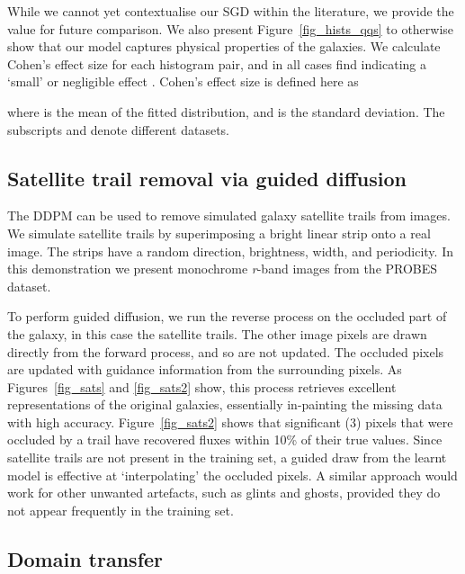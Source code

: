 \documentclass[fleqn,usenatbib]{mnras}
\begin{document}
While we cannot yet contextualise our SGD within the literature, we provide the
value for future comparison. We also present Figure~\ref{fig_hists_qqs} to
otherwise show that our model captures physical properties of the galaxies. We
calculate Cohen's  effect size for each histogram pair, and in all cases
find  indicating a `small' or negligible effect
\citep{cite_cohen1988}. 
Cohen's  effect size is defined here as

where  is the mean of the fitted distribution, and  is the standard
deviation. The subscripts  and  denote different datasets.

\subsection{Satellite trail removal via guided diffusion}

The DDPM can be used to remove simulated galaxy satellite trails from images.
We simulate satellite trails by superimposing a bright linear strip onto a real
image. The strips have a random direction, brightness, width, and periodicity.
In this demonstration we present monochrome {\it r}-band images from the PROBES
dataset.

To perform guided diffusion, we run the reverse process on the occluded part of
the galaxy, in this case the satellite trails. The other image pixels are drawn
directly from the forward process, and so are not updated. The occluded pixels 
are updated with guidance information from the surrounding pixels. 
As Figures~\ref{fig_sats} and \ref{fig_sats2} show, this process
retrieves excellent representations of the original galaxies, essentially
in-painting the missing data with high accuracy. Figure~\ref{fig_sats2} shows
that significant (3) pixels that were occluded by a trail have
recovered fluxes within 10\% of their true values. Since satellite trails are
not present in the training set, a guided draw from the learnt model is
effective at `interpolating' the occluded pixels. A similar approach would work
for other unwanted artefacts, such as glints and ghosts, provided they do not
appear frequently in the training set.

\subsection{Domain transfer} \label{sec_domaintransfer}
\end{document}
